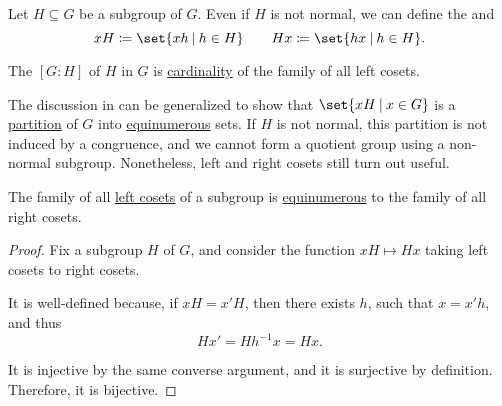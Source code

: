 \begin{definition}\label{def:subgroup_cosets}
  Let \( H \subseteq G \) be a subgroup of \( G \). Even if \( H \) is not normal, we can define the  and 
  \begin{equation*}
    x H \coloneqq \set{ xh \given h \in H }
    \quad\quad
    H x \coloneqq \set{ hx \given h \in H }.
  \end{equation*}

  The  \( [G : H] \) of \( H \) in \( G \) is \hyperref[def:cardinal]{cardinality} of the family of all left cosets.

  The discussion in  can be generalized to show that  \( \set{ xH \given x \in G } \) is a \hyperref[def:set_partition]{partition} of \( G \) into \hyperref[def:equinumerosity]{equinumerous} sets. If \( H \) is not normal, this partition is not induced by a congruence, and we cannot form a quotient group using a non-normal subgroup. Nonetheless, left and right cosets still turn out useful.
\end{definition}

\begin{proposition}\label{thm:group_coset_bijection}
  The family of all \hyperref[def:subgroup_cosets]{left cosets} of a subgroup is \hyperref[def:equinumerosity]{equinumerous} to the family of all right cosets.
\end{proposition}
\begin{proof}
  Fix a subgroup \( H \) of \( G \), and consider the function \( xH \mapsto Hx \) taking left cosets to right cosets.

  It is well-defined because, if \( x H = x' H \), then there exists \( h \), such that \( x = x' h \), and thus
  \begin{equation*}
    H x' = H h^{-1} x = H x.
  \end{equation*}

  It is injective by the same converse argument, and it is surjective by definition. Therefore, it is bijective.
\end{proof}

